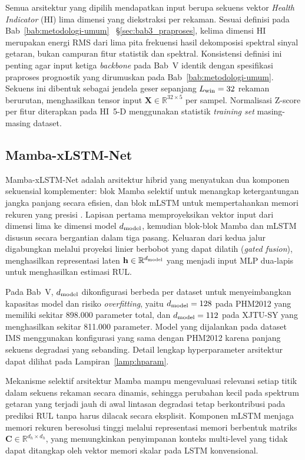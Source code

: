 Semua arsitektur yang dipilih mendapatkan input berupa sekuens vektor \emph{Health
Indicator} (HI) lima dimensi yang diekstraksi per rekaman.
{\color{blue}Sesuai definisi pada Bab~\ref{bab:metodologi-umum}~%
\S\ref{sec:bab3_praproses}, kelima dimensi HI merupakan energi RMS dari
lima pita frekuensi hasil dekomposisi spektral sinyal getaran, bukan
campuran fitur statistik dan spektral. Konsistensi definisi ini penting
agar input ketiga \emph{backbone} pada Bab~V identik dengan spesifikasi
praproses prognostik yang dirumuskan pada Bab~\ref{bab:metodologi-umum}.}
Sekuens ini dibentuk sebagai jendela geser sepanjang $L_{\rm win} = 32$
rekaman berurutan, menghasilkan tensor input $\mathbf{X} \in
\mathbb{R}^{32 \times 5}$ per sampel.
Normalisasi Z-score per fitur diterapkan pada HI~5-D menggunakan statistik
\emph{training set} masing-masing dataset.

\subsection{Mamba-xLSTM-Net}
\label{subsec:bab5_mamba_xlstm}

Mamba-xLSTM-Net adalah arsitektur hibrid yang menyatukan dua komponen
sekuensial komplementer: blok Mamba selektif untuk menangkap ketergantungan
jangka panjang secara efisien, dan blok mLSTM untuk mempertahankan memori
rekuren yang presisi
{\color{blue}}.
Lapisan pertama memproyeksikan vektor input dari dimensi lima ke dimensi model
$d_{\rm model}$, kemudian blok-blok Mamba dan mLSTM disusun secara bergantian
dalam tiga pasang.
Keluaran dari kedua jalur digabungkan melalui proyeksi linier berbobot yang
dapat dilatih (\emph{gated fusion}), menghasilkan representasi laten
$\mathbf{h} \in \mathbb{R}^{d_{\rm model}}$ yang menjadi input MLP
dua-lapis untuk menghasilkan estimasi RUL.

Pada Bab~V, $d_{\rm model}$ dikonfigurasi berbeda per dataset untuk
menyeimbangkan kapasitas model dan risiko \emph{overfitting}, yaitu $d_{\rm model}
= 128$ pada PHM2012 yang memiliki sekitar 898.000 parameter total, dan
$d_{\rm model} = 112$ pada XJTU-SY yang menghasilkan sekitar 811.000 parameter.
Model yang dijalankan pada dataset IMS menggunakan konfigurasi yang sama dengan PHM2012 karena panjang sekuens
degradasi yang sebanding.
Detail lengkap hyperparameter arsitektur dapat dilihat pada
Lampiran~\ref{lamp:hparam}.

Mekanisme selektif arsitektur Mamba mampu mengevaluasi relevansi setiap titik dalam sekuens
rekaman secara dinamis, sehingga perubahan kecil pada spektrum getaran yang
terjadi jauh di awal lintasan degradasi tetap berkontribusi pada prediksi RUL
tanpa harus dilacak secara eksplisit.
Komponen mLSTM menjaga memori rekuren beresolusi tinggi melalui representasi
memori berbentuk matriks $\mathbf{C} \in \mathbb{R}^{d_h \times d_h}$, yang
memungkinkan penyimpanan konteks multi-level yang tidak dapat ditangkap oleh
vektor memori skalar pada LSTM konvensional.

